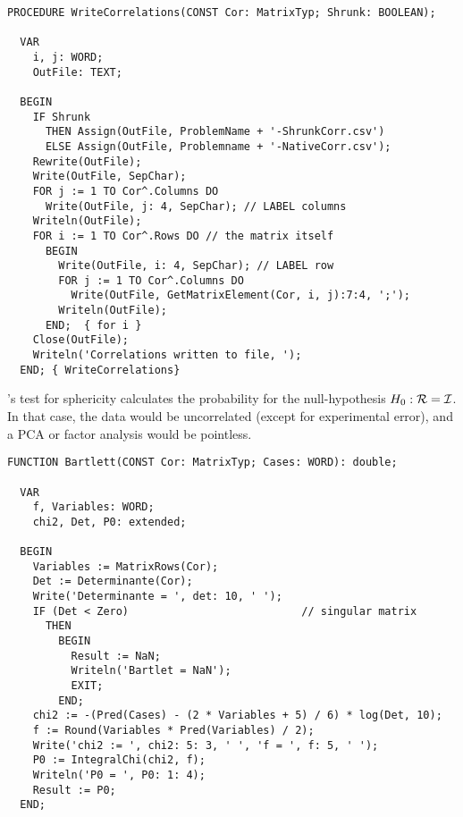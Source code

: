 \begin{lstlisting}[caption=Write the correlation matrix to a csv-file]
  PROCEDURE WriteCorrelations(CONST Cor: MatrixTyp; Shrunk: BOOLEAN);

  VAR
    i, j: WORD;
    OutFile: TEXT;

  BEGIN
    IF Shrunk
      THEN Assign(OutFile, ProblemName + '-ShrunkCorr.csv')
      ELSE Assign(OutFile, Problemname + '-NativeCorr.csv');
    Rewrite(OutFile);
    Write(OutFile, SepChar);
    FOR j := 1 TO Cor^.Columns DO
      Write(OutFile, j: 4, SepChar); // LABEL columns
    Writeln(OutFile);
    FOR i := 1 TO Cor^.Rows DO // the matrix itself
      BEGIN
        Write(OutFile, i: 4, SepChar); // LABEL row
        FOR j := 1 TO Cor^.Columns DO
          Write(OutFile, GetMatrixElement(Cor, i, j):7:4, ';');
        Writeln(OutFile);
      END;  { for i }
    Close(OutFile);
    Writeln('Correlations written to file, ');
  END; { WriteCorrelations}
\end{lstlisting}

's test for sphericity calculates the probability for the null-hypothesis \(H_0: \mathcal{R} = \mathcal{I} \). In that case, the data would be uncorrelated (except for experimental error), and a \acs{PCA} or factor analysis would be pointless.

\begin{lstlisting}[caption=Perform Bartlett's sphericity-test]
  FUNCTION Bartlett(CONST Cor: MatrixTyp; Cases: WORD): double;

  VAR
    f, Variables: WORD;
    chi2, Det, P0: extended;

  BEGIN
    Variables := MatrixRows(Cor);
    Det := Determinante(Cor);
    Write('Determinante = ', det: 10, ' ');
    IF (Det < Zero)                           // singular matrix
      THEN
        BEGIN
          Result := NaN;
          Writeln('Bartlet = NaN');
          EXIT;
        END;
    chi2 := -(Pred(Cases) - (2 * Variables + 5) / 6) * log(Det, 10);
    f := Round(Variables * Pred(Variables) / 2);
    Write('chi2 := ', chi2: 5: 3, ' ', 'f = ', f: 5, ' ');
    P0 := IntegralChi(chi2, f);
    Writeln('P0 = ', P0: 1: 4);
    Result := P0;
  END;
\end{lstlisting}

